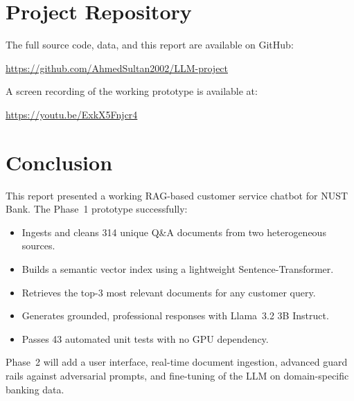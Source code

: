 \documentclass[12pt,a4paper]{article}
\begin{document}
\section{Project Repository}

The full source code, data, and this report are available on GitHub:

\begin{center}
  \url{https://github.com/AhmedSultan2002/LLM-project}
\end{center}

A screen recording of the working prototype is available at:

\begin{center}
  \url{https://youtu.be/ExkX5Fnjcr4}
\end{center}

\section{Conclusion}

This report presented a working RAG-based customer service chatbot for NUST Bank.
The Phase~1 prototype successfully:

\begin{itemize}
  \item Ingests and cleans 314 unique Q\&A documents from two heterogeneous sources.
  \item Builds a semantic vector index using a lightweight Sentence-Transformer.
  \item Retrieves the top-3 most relevant documents for any customer query.
  \item Generates grounded, professional responses with Llama~3.2 3B Instruct.
  \item Passes 43 automated unit tests with no GPU dependency.
\end{itemize}

Phase~2 will add a user interface, real-time document ingestion, advanced guard
rails against adversarial prompts, and fine-tuning of the LLM on domain-specific
banking data.
\end{document}
